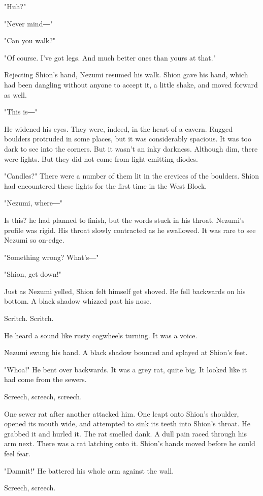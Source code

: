 "Huh?"

"Never mind―"

"Can you walk?"

"Of course. I've got legs. And much better ones than yours at that."

Rejecting Shion's hand, Nezumi resumed his walk. Shion gave his hand,
which had been dangling without anyone to accept it, a little shake, and
moved forward as well.

"This is―"

He widened his eyes. They were, indeed, in the heart of a cavern. Rugged
boulders protruded in some places, but it was considerably spacious. It
was too dark to see into the corners. But it wasn't an inky darkness.
Although dim, there were lights. But they did not come from
light-emitting diodes.

"Candles?" There were a number of them lit in the crevices of the
boulders. Shion had encountered these lights for the first time in the
West Block.

"Nezumi, where―"

Is this? he had planned to finish, but the words stuck in his throat.
Nezumi's profile was rigid. His throat slowly contracted as he
swallowed. It was rare to see Nezumi so on-edge.

"Something wrong? What's―"

"Shion, get down!"

Just as Nezumi yelled, Shion felt himself get shoved. He fell backwards
on his bottom. A black shadow whizzed past his nose.

Scritch. Scritch.

He heard a sound like rusty cogwheels turning. It was a voice.

Nezumi swung his hand. A black shadow bounced and splayed at Shion's
feet.

"Whoa!" He bent over backwards. It was a grey rat, quite big. It looked
like it had come from the sewers.

Screech, screech, screech.

One sewer rat after another attacked him. One leapt onto Shion's
shoulder, opened its mouth wide, and attempted to sink its teeth into
Shion's throat. He grabbed it and hurled it. The rat smelled dank. A
dull pain raced through his arm next. There was a rat latching onto it.
Shion's hands moved before he could feel fear.

"Damnit!" He battered his whole arm against the wall.

Screech, screech.

